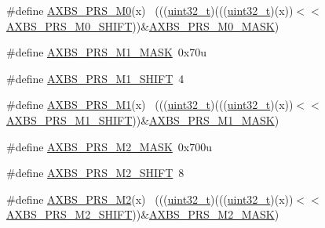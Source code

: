 \begin{DoxyCompactItemize}
\item 
\#define \hyperlink{group___a_x_b_s___register___masks_ga6a2c79e55f5424e6d4e863a6f51c8250}{A\+X\+B\+S\+\_\+\+P\+R\+S\+\_\+\+M0}(x)                                                  ~(((\hyperlink{_p_e___types_8h_a33594304e786b158f3fb30289278f5af}{uint32\+\_\+t})(((\hyperlink{_p_e___types_8h_a33594304e786b158f3fb30289278f5af}{uint32\+\_\+t})(x))$<$$<$\hyperlink{group___a_x_b_s___register___masks_ga86a8f40f6a5d45cd4868dce4833a17d5}{A\+X\+B\+S\+\_\+\+P\+R\+S\+\_\+\+M0\+\_\+\+S\+H\+I\+FT}))\&\hyperlink{group___a_x_b_s___register___masks_ga9e794f0ace10f0e077a92ce9f5abbb41}{A\+X\+B\+S\+\_\+\+P\+R\+S\+\_\+\+M0\+\_\+\+M\+A\+SK})
\item 
\#define \hyperlink{group___a_x_b_s___register___masks_ga69131fbb37b2a3eef0e0f135e265e1c0}{A\+X\+B\+S\+\_\+\+P\+R\+S\+\_\+\+M1\+\_\+\+M\+A\+SK}~0x70u
\item 
\#define \hyperlink{group___a_x_b_s___register___masks_gab293a628aa64a93c04ba49fd27326592}{A\+X\+B\+S\+\_\+\+P\+R\+S\+\_\+\+M1\+\_\+\+S\+H\+I\+FT}~4
\item 
\#define \hyperlink{group___a_x_b_s___register___masks_ga6ae77cbf64e41e6732945b6315dd3a7e}{A\+X\+B\+S\+\_\+\+P\+R\+S\+\_\+\+M1}(x)                                                  ~(((\hyperlink{_p_e___types_8h_a33594304e786b158f3fb30289278f5af}{uint32\+\_\+t})(((\hyperlink{_p_e___types_8h_a33594304e786b158f3fb30289278f5af}{uint32\+\_\+t})(x))$<$$<$\hyperlink{group___a_x_b_s___register___masks_gab293a628aa64a93c04ba49fd27326592}{A\+X\+B\+S\+\_\+\+P\+R\+S\+\_\+\+M1\+\_\+\+S\+H\+I\+FT}))\&\hyperlink{group___a_x_b_s___register___masks_ga69131fbb37b2a3eef0e0f135e265e1c0}{A\+X\+B\+S\+\_\+\+P\+R\+S\+\_\+\+M1\+\_\+\+M\+A\+SK})
\item 
\#define \hyperlink{group___a_x_b_s___register___masks_gacd2feac8facc9d0b21f438eef172fd81}{A\+X\+B\+S\+\_\+\+P\+R\+S\+\_\+\+M2\+\_\+\+M\+A\+SK}~0x700u
\item 
\#define \hyperlink{group___a_x_b_s___register___masks_gacf78955a5852e31c71c1542d873df6b3}{A\+X\+B\+S\+\_\+\+P\+R\+S\+\_\+\+M2\+\_\+\+S\+H\+I\+FT}~8
\item 
\#define \hyperlink{group___a_x_b_s___register___masks_ga62c82426cf92f9a2296ab84014ee8096}{A\+X\+B\+S\+\_\+\+P\+R\+S\+\_\+\+M2}(x)                                                  ~(((\hyperlink{_p_e___types_8h_a33594304e786b158f3fb30289278f5af}{uint32\+\_\+t})(((\hyperlink{_p_e___types_8h_a33594304e786b158f3fb30289278f5af}{uint32\+\_\+t})(x))$<$$<$\hyperlink{group___a_x_b_s___register___masks_gacf78955a5852e31c71c1542d873df6b3}{A\+X\+B\+S\+\_\+\+P\+R\+S\+\_\+\+M2\+\_\+\+S\+H\+I\+FT}))\&\hyperlink{group___a_x_b_s___register___masks_gacd2feac8facc9d0b21f438eef172fd81}{A\+X\+B\+S\+\_\+\+P\+R\+S\+\_\+\+M2\+\_\+\+M\+A\+SK})
$$
\end{DoxyCompactItemize}

